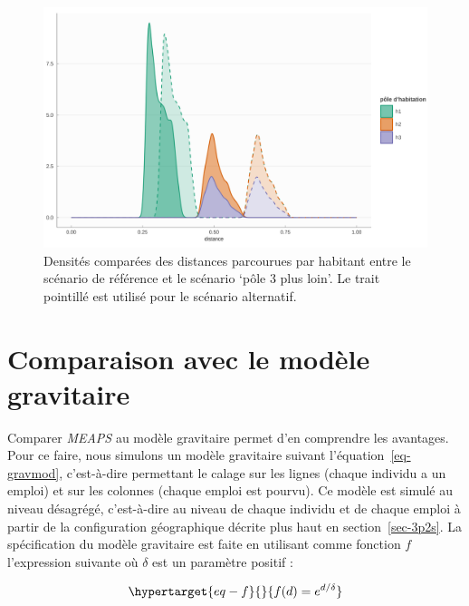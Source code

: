 \documentclass[
  10pt,
  a4paper,
  numbers=noendperiod,
  DIV=9]{scrartcl}
\begin{document}
\begin{figure}[htb]

{\centering \includegraphics[width=1\textwidth,height=\textheight]{output/gdenshabg.png}

}

\caption[Densités comparées]{\label{fig-denscomp}Densités comparées des
distances parcourues par habitant entre le scénario de référence et le
scénario `pôle 3 plus loin'. Le trait pointillé est utilisé pour le
scénario alternatif.}

\end{figure}

\hypertarget{sec-compgravsynth}{%
\section{Comparaison avec le modèle
gravitaire}\label{sec-compgravsynth}}

Comparer \emph{MEAPS} au modèle gravitaire permet d'en comprendre les
avantages. Pour ce faire, nous simulons un modèle gravitaire suivant
l'équation~\ref{eq-gravmod}, c'est-à-dire permettant le calage sur les
lignes (chaque individu a un emploi) et sur les colonnes (chaque emploi
est pourvu). Ce modèle est simulé au niveau désagrégé, c'est-à-dire au
niveau de chaque individu et de chaque emploi à partir de la
configuration géographique décrite plus haut en section~\ref{sec-3p2s}.
La spécification du modèle gravitaire est faite en utilisant comme
fonction \(f\) l'expression suivante où \(\delta\) est un paramètre
positif :

\begin{equation}\protect\hypertarget{eq-f}{}{
f(d) = e^{d/\delta}
}\label{eq-f}\end{equation}
\end{document}
